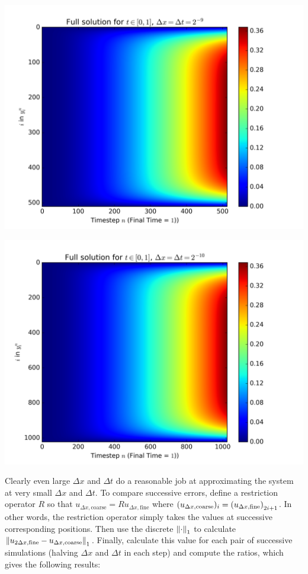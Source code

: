 \documentclass{article} %
\theoremstyle{plain}
\newcommand{\Dx}{\Delta x}
\newcommand{\Dt}{\Delta t}
\numberwithin{equation}{section} %
\numberwithin{figure}{section} %
\numberwithin{table}{section} %
\begin{document}
\begin{minipage}{0.5\textwidth}
    \includegraphics[width=\textwidth]{problem_2_6.png}
\end{minipage}\hfill
\begin{minipage}{0.5\textwidth}
    \includegraphics[width=\textwidth]{problem_2_7.png}
\end{minipage}
Clearly even large $\Dx$ and $\Dt$ do a reasonable job at approximating the system at very small $\Dx$ and $\Dt$.  To compare successive errors, define a restriction operator $R$ so that $u_{\Dx,\text{coarse}} = Ru_{\Dx,\text{fine}}$ where $(u_{\Dx,\text{coarse}})_i = \qty(u_{\Dx,\text{fine}})_{2i+1}$.  In other words, the restriction operator simply takes the values at successive corresponding positions.  Then use the discrete $\norm{\cdot}_1$ to calculate $\norm{u_{2\Dx,\text{fine}} - u_{\Dx,\text{coarse}}}_1$.  Finally, calculate this value for each pair of successive simulations (halving $\Dx$ and $\Dt$ in each step) and compute the ratios, which gives the following results:
\end{document}
